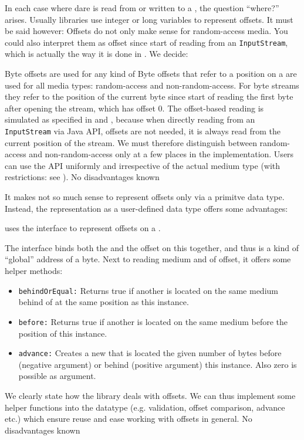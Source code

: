 In each case where dare is read from or written to a \TERMmedium{}, the question ``where?'' arises. Usually libraries use integer or long variables to represent offsets. It must be said however: Offsets do not only make sense for random-access media. You could also interpret them as offset since start of reading from an \texttt{InputStream}, which is actually the way it is done in \LibName{}. We decide:

{%
Byte offsets are used for any kind of \TERMmedia{}
}
{%
Byte offsets that refer to a position on a \TERMmedium{} are used for all media types: random-access and non-random-access. For byte streams they refer to the position of the current byte since start of reading the first byte after opening the stream, which has offset 0. The offset-based reading is simulated as specified in  and , because when directly reading from an \texttt{InputStream} via Java API, offsets are not needed, it is always read from the current position of the stream. 
}
{%
We must therefore distinguish between random-access and non-random-access only at a few places in the implementation. Users can use the API uniformly and irrespective of the actual medium type (with restrictions: see ).
}
{%
No disadvantages known
}

It makes not so much sense to represent offsets only via a primitve data type. Instead, the representation as a user-defined data type offers some advantages:

{%
\LibName{} uses the interface \IMediumReference{} to represent offsets on a \TERMmedium{}.
}
{%
The interface binds both the \TERMmedium{} and the offset on this \TERMmedium{} together, and thus is a kind of ``global'' address of a byte. Next to reading medium and of offset, it offers some helper methods:
\begin{itemize}
\item \texttt{behindOrEqual:} Returns true if another \IMediumReference{} is located on the same medium behind of at the same position as this instance.
\item \texttt{before:} Returns true if another \IMediumReference{} is located on the same medium before the position of this instance.
\item \texttt{advance:} Creates a new \IMediumReference{} that is located the given number of bytes before (negative argument) or behind (positive argument) this instance. Also zero is possible as argument.
\end{itemize}
}
{%
We clearly state how the library deals with offsets. We can thus implement some helper functions into the datatype (e.g. validation, offset comparison, advance etc.) which ensure reuse and ease working with offsets in general.
}
{%
No disadvantages known
}

